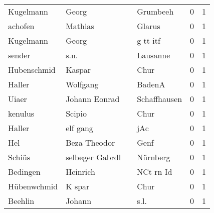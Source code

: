 \begin{tabular}{llllrr}
                Kugelmann &                              Georg &             &                                    Grumbeeh &          0 &         1 \\
                  achofen &                            Mathias &             &                                      Glarus &          0 &         1 \\
                Kugelmann &                              Georg &             &                                    g tt itf &          0 &         1 \\
                   sender &                               s.n. &             &                                    Lausanne &          0 &         1 \\
              Hubenschmid &                             Kaspar &             &                                        Chur &          0 &         1 \\
                   Haller &                           Wolfgang &             &                                      BadenA &          0 &         1 \\
                    Uiaer &                      Johann Eonrad &             &                                Schaffhausen &          0 &         1 \\
                  kenulus &                             Scipio &             &                                        Chur &          0 &         1 \\
                   Haller &                           elf gang &             &                                         jAc &          0 &         1 \\
                      Hel &                       Beza Theodor &             &                                        Genf &          0 &         1 \\
                   Schiüs &                    selbeger Gabrdl &             &                                    Nürnberg &          0 &         1 \\
                 Bedingen &                           Heinrich &             &                                   NCt rn Id &          0 &         1 \\
              Hübenwchmid &                             K spar &             &                                        Chur &          0 &         1 \\
                  Beehlin &                             Johann &             &                                        s.l. &          0 &         1 \\

\end{tabular}
